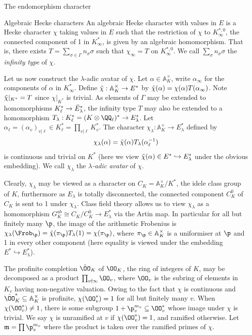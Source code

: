 \documentclass[11pt,a4paper]{article}
\begin{document}
\begin{section}{The endomorphism character}
\begin{subsection}{Algebraic Hecke characters}
An algebraic Hecke character with values in $E$ is a Hecke character $\chi$ taking values in $E$ such that the restriction of $\chi$ to $K_\infty^{*, 0}$, the connected component of 1 in $K_\infty^*$, is given by an algebraic homomorphism. That is, there exists $T = \sum_{\sigma \in \Gamma} n_\sigma \sigma $ such that $\chi_\infty = T$ on $K_\infty^{*, 0}$. We call $\sum_\sigma n_\sigma \sigma$ the \emph{infinity type} of $\chi$.

Let us now construct the $\lambda$-adic avatar of $\chi$.
Let $\alpha \in \mathbb{A}_K^\times$, write $\alpha_\infty$ for the components of $\alpha$ in $K^*_\infty$.
Define $\Tilde{\chi}: \mathbb{A}_K^\times \rightarrow E^*$ by $ \Tilde{\chi}(\alpha) = \chi(\alpha) T(\alpha_\infty) $. Note $\Tilde{\chi}|_{K^*} = T$ since ${\chi}|_{K^*}$ is trivial. %
As elements of $\Gamma$ may be extended to homomorphisms $K_\ell^* \rightarrow \Bar{E}_\lambda^*$, the infinity type $T$ may also be extended to a homomorphism $T_\lambda:K_\ell^* = (K\otimes \QQ_\ell)^* \rightarrow E_\lambda^*$.
Let $\alpha_\ell = (\alpha_v)_{v|\ell} \in K_\ell^* = \prod_{v|\ell} K_v^*$.
The character $\chi_\lambda:\mathbb{A}_K^\times \rightarrow E_\lambda^*$ defined by $$ \chi_\lambda(\alpha) = \Tilde{\chi}(\alpha)T_\lambda(\alpha_\ell^{-1})$$
is continuous and trivial on $K^*$ (here we view $\Tilde{\chi}(\alpha)\in E^* \hookrightarrow E^*_\lambda$ under the obvious embedding).
We call $\chi_\lambda$ the \emph{$\lambda$-adic avatar} of $\chi$.

Clearly, $\chi_\lambda$ may be viewed as a character on $C_K = \mathbb{A}_K^\times/K^*$, the idele class group of $K$, furthermore as $E_\lambda$ is totally disconnected, the connected component $C_K^0$ of $C_K$ is sent to 1 under $\chi_\lambda$. Class field theory allows us to view $\chi_\lambda$ as a homomorphism $G_K^{ab} \cong C_K/C^0_K \rightarrow E_\lambda^*$ via the Artin map. In particular for all but finitely many $\p$, the image of the arithmetic Frobenius is $\chi_\lambda(\Frob_\p) = \Tilde{\chi}(\pi_\p)T_\lambda(1) = \chi(\pi_\p)$, where $\pi_\p \in \mathbb{A}_K^\times$ is a uniformiser at $\p$ and 1 in every other component (here equality is viewed under the embedding $E^* \hookrightarrow E^*_\lambda$).


The profinite completion $\hat{\OO}_K$ of $\OO_K$, the ring of integers of $K$, may be decomposed as a product $\prod_{v \nmid \infty}\OO_v$, where $\OO_v$ is the subring of elements in $K_v$ having non-negative valuation.
Owing to the fact that $\chi$ is continuous and $\hat{\OO}_K^* \subseteq \mathbb{A}_K^\times$ is profinite, $\chi(\OO_v^*)=1$ for all but finitely many $v$. When $\chi(\OO_v^*)\neq1$, there is some subgroup $1+\p_v^{m_v} \subseteq \OO_v^*$ whose image under $\chi$ is trivial.
We say $\chi$ is unramified at $v$ if $\chi(\OO_v^*)=1$, and ramified otherwise.
Let $\mathfrak{m} =\prod \p_v^{m_v} $ where the product is taken over the ramified primes of $\chi$.


\end{subsection}
\end{section}
\end{document}
